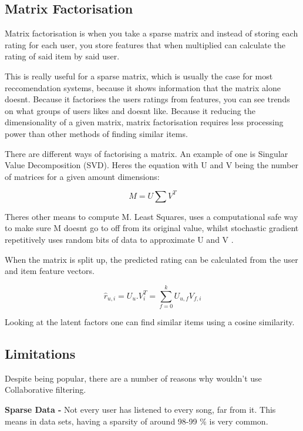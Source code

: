 \subsection{Matrix Factorisation}

Matrix factorisation is when you take a sparse matrix and instead of storing each rating for each user, you store features that when multiplied can calculate the rating of said item by said user.

This is really useful for a sparse matrix, which is usually the case for most reccomendation systems, because it shows information that the matrix alone doesnt. Because it factorises the users ratings from features, you can see trends on what groups of users likes and doesnt like. Because it reducing the dimensionality of a given matrix, matrix factorisation requires less processing power than other methods of finding similar items. 

There are different ways of factorising a matrix. An example of one is Singular Value Decomposition (SVD). Heres the equation with U and V being the number of matrices for a given amount dimensions:

\begin{equation}
	M = U \sum V ^{T}
\end{equation}

Theres other means to compute M. Least Squares, uses a computational safe way to make sure M doesnt go to off from its original value, whilst stochastic gradient repetitively uses random bits of data to approximate U and V \citep{koren_matrix_2009}. 

When the matrix is split up, the predicted rating can be calculated from the user and item feature vectors. 

\begin{equation}
	\hat{r} _{u,i} = U _{u} . V _{i}^{T} = \sum_{f=0}^{k} U_{u,f} V_{f, i}
\end{equation}

Looking at the latent factors one can find  similar items using a cosine similarity.

\subsection{Limitations}
Despite being popular, there are a number of reasons why wouldn't use Collaborative filtering.

\textbf{Sparse Data - }Not every user has listened to every song, far from it. This means in data sets, having a sparsity of around 98-99 \% is very common.

